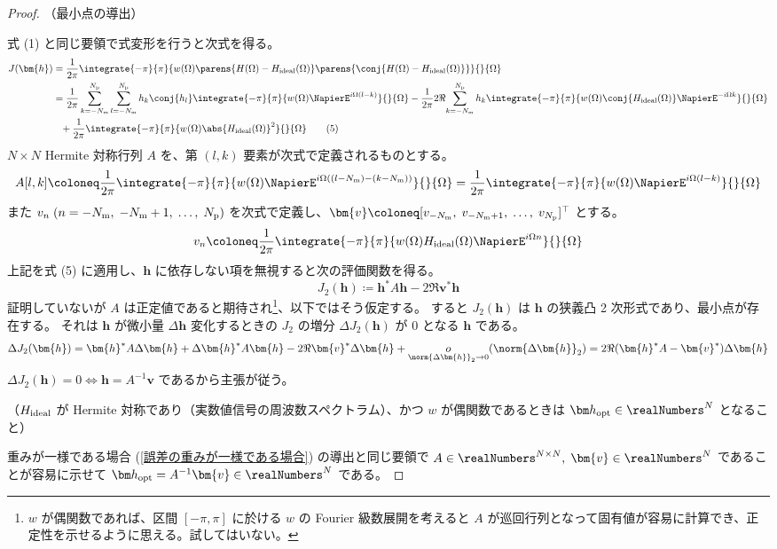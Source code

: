             \begin{proof}
                \quad\par\noindent
                （最小点の導出）
                \par
                式 (1) と同じ要領で式変形を行うと次式を得る。
                \begin{align*}
                    J(\bm{h}) &= \frac{1}{2\pi}\integrate{-\pi}{\pi}{w(\Omega)\parens{H(\Omega)-\Hideal(\Omega)}\parens{\conj{H(\Omega)-\Hideal(\Omega)}}}{}{\Omega} \\
                    &= \frac{1}{2\pi}\sum_{k=-\Nm}^\Np\sum_{l=-\Nm}^\Np h_k\conj{h_l}\integrate{-\pi}{\pi}{w(\Omega)\NapierE^{i\Omega(l-k)}}{}{\Omega} - \frac{1}{2\pi}2\Re{\sum_{k=-\Nm}^\Np h_k\integrate{-\pi}{\pi}{w(\Omega)\conj{\Hideal(\Omega)}\NapierE^{-i\Omega k}}{}{\Omega}} \\
                    &\phantom{=} + \frac{1}{2\pi}\integrate{-\pi}{\pi}{w(\Omega)\abs{\Hideal(\Omega)}^2}{}{\Omega}\tag{5}
                \end{align*}
                $N\times N$ Hermite 対称行列 $A$ を、第 $(l,k)$ 要素が次式で定義されるものとする。
                \[ A[l,k] \coloneq \frac{1}{2\pi}\integrate{-\pi}{\pi}{w(\Omega)\NapierE^{i\Omega((l-\Nm)-(k-\Nm))}}{}{\Omega} = \frac{1}{2\pi}\integrate{-\pi}{\pi}{w(\Omega)\NapierE^{i\Omega(l-k)}}{}{\Omega} \]
                また $v_n\;(n=-{N_\text{m}},\;-{N_\text{m}}+1,\;\dots,\;{N_\text{p}})$ を次式で定義し、$\bm{v}\coloneq[v_{-\Nm},\;v_{-\Nm+1},\;\dots,\;v_\Np]^\top$ とする。
                \[ v_n \coloneq \frac{1}{2\pi}\integrate{-\pi}{\pi}{w(\Omega)\Hideal(\Omega)\NapierE^{i\Omega n}}{}{\Omega} \]
                上記を式 (5) に適用し、$\bm{h}$ に依存しない項を無視すると次の評価関数を得る。
                \[ J_2(\bm{h}) \coloneq \bm{h}^*A\bm{h} - 2\Re{\bm{v}^*\bm{h}} \]
                証明していないが $A$ は正定値であると期待され\footnote{$w$ が偶関数であれば、区間 $[-\pi,\pi]$ に於ける $w$ の Fourier 級数展開を考えると $A$ が巡回行列となって固有値が容易に計算でき、正定性を示せるように思える。試してはいない。}、以下ではそう仮定する。
                すると $J_2(\bm{h})$ は $\bm{h}$ の狭義凸 2 次形式であり、最小点が存在する。
                それは $\bm{h}$ が微小量 $\Delta\bm{h}$ 変化するときの $J_2$ の増分 $\Delta J_2(\bm{h})$ が 0 となる $\bm{h}$ である。
                \[ \Delta J_2(\bm{h}) = \bm{h}^*A\Delta\bm{h} + \Delta\bm{h}^*A\bm{h} - 2\Re{\bm{v}^*\Delta\bm{h}} + \underset{\norm{\Delta\bm{h}}_2\to 0}{o}(\norm{\Delta\bm{h}}_2) = 2\Re{(\bm{h}^*A-\bm{v}^*)\Delta\bm{h}} \]
                $\Delta J_2(\bm{h}) = 0\iff\bm{h} = A^{-1}\bm{v}$ であるから主張が従う。
                \newline
                \par\noindent
                （$H_\text{ideal}$ が Hermite 対称であり（実数値信号の周波数スペクトラム）、かつ $w$ が偶関数であるときは $\vhOpt\in\realNumbers^N$ となること）
                \par
                重みが一様である場合 (\cref{誤差の重みが一様である場合}) の導出と同じ要領で $A\in\realNumbers^{N\times N},\;\bm{v}\in\realNumbers^N$ であることが容易に示せて $\vhOpt=A^{-1}\bm{v}\in\realNumbers^N$ である。
            \end{proof}
